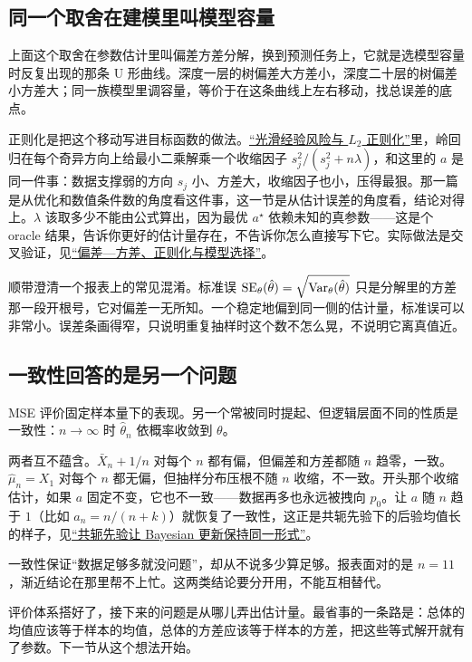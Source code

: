 \subsection{同一个取舍在建模里叫模型容量}

上面这个取舍在参数估计里叫偏差方差分解，换到预测任务上，它就是选模型容量时反复出现的那条 U 形曲线。深度一层的树偏差大方差小，深度二十层的树偏差小方差大；同一族模型里调容量，等价于在这条曲线上左右移动，找总误差的底点。

正则化是把这个移动写进目标函数的做法。\hyperref[sec:09-Convex-Optimization/07-Applications/01]{``光滑经验风险与 \(L_2\) 正则化''}里，岭回归在每个奇异方向上给最小二乘解乘一个收缩因子 \(s_j^2/(s_j^2+n\lambda)\)，和这里的 \(a\) 是同一件事：数据支撑弱的方向 \(s_j\) 小、方差大，收缩因子也小，压得最狠。那一篇是从优化和数值条件数的角度看这件事，这一节是从估计误差的角度看，结论对得上。\(\lambda\) 该取多少不能由公式算出，因为最优 \(a^\star\) 依赖未知的真参数——这是个 oracle 结果，告诉你更好的估计量存在，不告诉你怎么直接写下它。实际做法是交叉验证，见\hyperref[sec:11-Mathematical-Statistics/06-Resampling-and-Model-Selection/04]{``偏差---方差、正则化与模型选择''}。

顺带澄清一个报表上的常见混淆。标准误 \(\operatorname{SE}_\theta(\hat\theta)=\sqrt{\operatorname{Var}_\theta(\hat\theta)}\) 只是分解里的方差那一段开根号，它对偏差一无所知。一个稳定地偏到同一侧的估计量，标准误可以非常小。误差条画得窄，只说明重复抽样时这个数不怎么晃，不说明它离真值近。

\subsection{一致性回答的是另一个问题}

MSE 评价固定样本量下的表现。另一个常被同时提起、但逻辑层面不同的性质是一致性：\(n\to\infty\) 时 \(\hat\theta_n\) 依概率收敛到 \(\theta\)。

两者互不蕴含。\(\bar X_n+1/n\) 对每个 \(n\) 都有偏，但偏差和方差都随 \(n\) 趋零，一致。\(\hat\mu_n=X_1\) 对每个 \(n\) 都无偏，但抽样分布压根不随 \(n\) 收缩，不一致。开头那个收缩估计，如果 \(a\) 固定不变，它也不一致——数据再多也永远被拽向 \(p_0\)。让 \(a\) 随 \(n\) 趋于 \(1\)（比如 \(a_n=n/(n+k)\)）就恢复了一致性，这正是共轭先验下的后验均值长的样子，见\hyperref[sec:13-Machine-Learning/06-Probabilistic-Models/07]{``共轭先验让 Bayesian 更新保持同一形式''}。

一致性保证``数据足够多就没问题''，却从不说多少算足够。报表面对的是 \(n=11\)，渐近结论在那里帮不上忙。这两类结论要分开用，不能互相替代。

评价体系搭好了，接下来的问题是从哪儿弄出估计量。最省事的一条路是：总体的均值应该等于样本的均值，总体的方差应该等于样本的方差，把这些等式解开就有了参数。下一节从这个想法开始。
